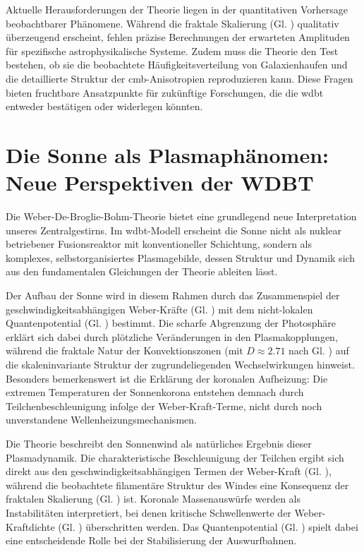 Aktuelle Herausforderungen der Theorie liegen in der quantitativen Vorhersage beobachtbarer Phänomene. Während die fraktale Skalierung (Gl. ) qualitativ überzeugend erscheint,
fehlen präzise Berechnungen der erwarteten Amplituden für spezifische astrophysikalische Systeme. Zudem muss die Theorie den Test bestehen, ob sie die beobachtete
Häufigkeitsverteilung von Galaxienhaufen und die detaillierte Struktur der \gls{cmb}-Anisotropien reproduzieren kann. Diese Fragen bieten fruchtbare Ansatzpunkte für zukünftige
Forschungen, die die \gls{wdbt} entweder bestätigen oder widerlegen könnten.

\section{Die Sonne als Plasmaphänomen: Neue Perspektiven der WDBT}
Die Weber-De-Broglie-Bohm-Theorie bietet eine grundlegend neue Interpretation unseres Zentralgestirns. Im \gls{wdbt}-Modell erscheint die Sonne nicht als nuklear betriebener
Fusionsreaktor mit konventioneller Schichtung, sondern als komplexes, selbstorganisiertes Plasmagebilde, dessen Struktur und Dynamik sich aus den fundamentalen Gleichungen der
Theorie ableiten lässt.

Der Aufbau der Sonne wird in diesem Rahmen durch das Zusammenspiel der geschwindigkeitsabhängigen Weber-Kräfte (Gl. ) mit dem nicht-lokalen Quantenpotential
(Gl. ) bestimmt. Die scharfe Abgrenzung der Photosphäre erklärt sich dabei durch plötzliche Veränderungen in den Plasmakopplungen, während die fraktale Natur der
Konvektionszonen (mit $D \approx 2.71$ nach Gl. ) auf die skaleninvariante Struktur der zugrundeliegenden Wechselwirkungen hinweist. Besonders bemerkenswert ist die Erklärung
der koronalen Aufheizung: Die extremen Temperaturen der Sonnenkorona entstehen demnach durch Teilchenbeschleunigung infolge der Weber-Kraft-Terme, nicht durch noch unverstandene
Wellenheizungsmechanismen.

Die Theorie beschreibt den Sonnenwind als natürliches Ergebnis dieser Plasmadynamik. Die charakteristische Beschleunigung der Teilchen ergibt sich direkt aus den
geschwindigkeitsabhängigen Termen der Weber-Kraft (Gl. ), während die beobachtete filamentäre Struktur des Windes eine Konsequenz der fraktalen Skalierung
(Gl. ) ist. Koronale Massenauswürfe werden als Instabilitäten interpretiert, bei denen kritische Schwellenwerte der Weber-Kraftdichte (Gl. )
überschritten werden. Das Quantenpotential (Gl. ) spielt dabei eine entscheidende Rolle bei der Stabilisierung der Auswurfbahnen.

